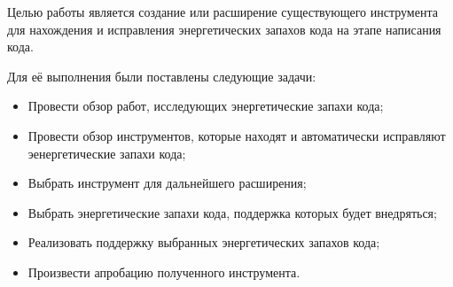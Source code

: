 Целью работы является создание или расширение существующего инструмента для нахождения и исправления энергетических запахов кода на этапе написания кода. 
 
Для её выполнения были поставлены следующие задачи:

\begin{itemize}
    \item Провести обзор работ, исследующих энергетические запахи кода;
    \item Провести обзор инструментов, которые находят и автоматически исправляют эенергетические запахи кода;
    \item Выбрать инструмент для дальнейшего расширения;
    \item Выбрать энергетические запахи кода, поддержка которых будет внедряться;
    \item Реализовать поддержку выбранных энергетических запахов кода;
    \item Произвести апробацию полученного инструмента.     
\end{itemize}
